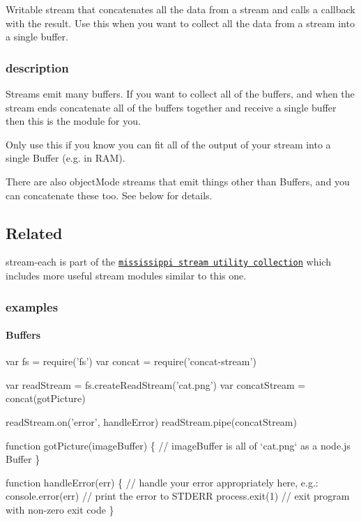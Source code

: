 Writable stream that concatenates all the data from a stream and calls a callback with the result. Use this when you want to collect all the data from a stream into a single buffer.

\href{https://travis-ci.org/maxogden/concat-stream}{\tt }

\href{https://nodei.co/npm/concat-stream/}{\tt }

\subsubsection*{description}

Streams emit many buffers. If you want to collect all of the buffers, and when the stream ends concatenate all of the buffers together and receive a single buffer then this is the module for you.

Only use this if you know you can fit all of the output of your stream into a single Buffer (e.\+g. in R\+AM).

There are also {\ttfamily object\+Mode} streams that emit things other than Buffers, and you can concatenate these too. See below for details.

\subsection*{Related}

{\ttfamily stream-\/each} is part of the \href{https://github.com/maxogden/mississippi}{\tt mississippi stream utility collection} which includes more useful stream modules similar to this one.

\subsubsection*{examples}

\paragraph*{Buffers}


\begin{DoxyCode}
var fs = require('fs')
var concat = require('concat-stream')

var readStream = fs.createReadStream('cat.png')
var concatStream = concat(gotPicture)

readStream.on('error', handleError)
readStream.pipe(concatStream)

function gotPicture(imageBuffer) \{
  // imageBuffer is all of `cat.png` as a node.js Buffer
\}

function handleError(err) \{
  // handle your error appropriately here, e.g.:
  console.error(err) // print the error to STDERR
  process.exit(1) // exit program with non-zero exit code
\}
\end{DoxyCode}


